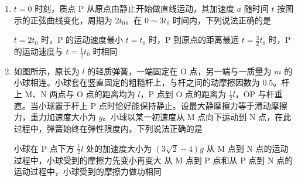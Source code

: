 \documentclass[\gkver]{gaokaozhenti}
\begin{document}
\begin{enumerate}
{故选 A。
}

\item
$t=0$ 时刻，质点 P 从原点由静止开始做直线运动，其加速度 $a$ 随时间 $t$ 按图示的正弦曲线变化，周期为 $2t_{0}$。在 $0 \sim 3t_{0}$ 时间内，下列说法正确的是 


{$t=2t_{0}$ 时，P 的运动速度最小}
{$t=t_{0}$ 时，P 到原点的距离最远}
{$t=\frac{3}{2}t_{0}$ 时，P 的运动速度与 $t=\frac{1}{2}t_{0}$ 时相同}


\item
如图所示，原长为 $l$ 的轻质弹簧，一端固定在 O 点，另一端与一质量为 $m$ 的小球相连。小球套在竖直固定的粗糙杆上，与杆之间的动摩擦因数为 0.5。杆上 M、N 两点与 O 点的距离均为 $l$，P 点到 O 点的距离为 $\frac{1}{2}l$，OP 与杆垂直。当小球置于杆上 P 点时恰好能保持静止。设最大静摩擦力等于滑动摩擦力，重力加速度大小为 $g$。小球以某一初速度从 M 点向下运动到 N 点，在此过程中，弹簧始终在弹性限度内。下列说法正确的是 


{小球在 P 点下方 $\frac{1}{2}l$ 处的加速度大小为 $(3\sqrt{2}-4)g$}
{从 M 点到 N 点的运动过程中，小球受到的摩擦力先变小再变大}
{从 M 点到 P 点和从 P 点到 N 点的运动过程中，小球受到的摩擦力做功相同}

\end{enumerate}
\end{document}
